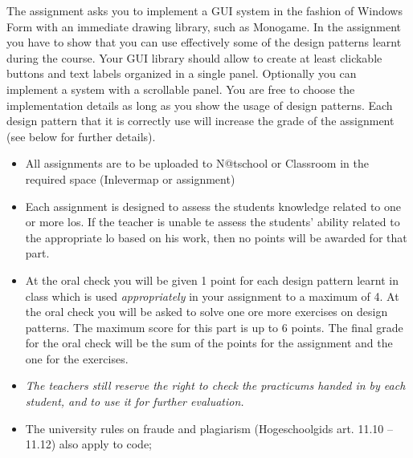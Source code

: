 The assignment asks you to implement a GUI system in the fashion of Windows Form with an immediate drawing library, such as Monogame. In the assignment you have to show that you can use effectively some of the design patterns learnt during the course. Your GUI library should allow to create at least clickable buttons and text labels organized in a single panel. Optionally you can implement a system with a scrollable panel. You are free to choose the implementation details as long as you show the usage of design patterns. Each design pattern that it is correctly use will increase the grade of the assignment (see below for further details).

\begin{itemize}
  \item All assignments are to be uploaded to N@tschool or Classroom in the required space (Inlevermap or assignment)
  \item Each assignment is designed to assess the students knowledge related to one or more \glspl{lo}.
          If the teacher is unable te assess the students' ability related to the appropriate \gls{lo} based on his work, then no points will be awarded for that part.
  \item At the oral check you will be given 1 point for each design pattern learnt in class which is used \textit{appropriately} in your assignment to a maximum of 4. At the oral check you will be asked to solve one ore more exercises on design patterns. The maximum score for this part is up to 6 points. The final grade for the oral check will be the sum of the points for the assignment and the one for the exercises.
  \item \textit{The teachers still reserve the right to check the practicums handed in by each student, and to use it for further evaluation.}
  \item The university rules on fraude and plagiarism (Hogeschoolgids art. 11.10 -- 11.12) also apply to code;
\end{itemize}
